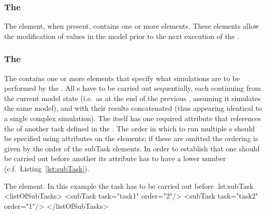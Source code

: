 \subsubsection{The }
\label{sec:changes}
The  element, when present, contains one or more  elements. These elements allow the modification of values in the model prior to the next execution of the .

\subsubsection{The }
\label{class:subTask}

The  contains one or more  elements that specify what simulations are to be performed by the .
All s have to be carried out sequentially, each continuing from the current model state (i.e.\ as at the end of the previous , assuming it simulates the same model), and with their results concatenated (thus appearing identical to a single complex simulation).
The  itself has one required attribute  that references the  of another task defined in the .
The order in which to run multiple s should be specified using  attributes on the  elements; if these are omitted the ordering is given by the order of the subTask elements.
In order to establish that one  should be carried out before another its  attribute has to have a lower number (c.f.\ Listing~\ref{lst:subTask}).

\begin{myXmlLst}{The  element. In this example the task  has to be carried out before .}{lst:subTask}
  <listOfSubTasks>
    <subTask task="task1" order="2"/> 
    <subTask task="task2" order="1"/> 
  </listOfSubTasks>
\end{myXmlLst}


